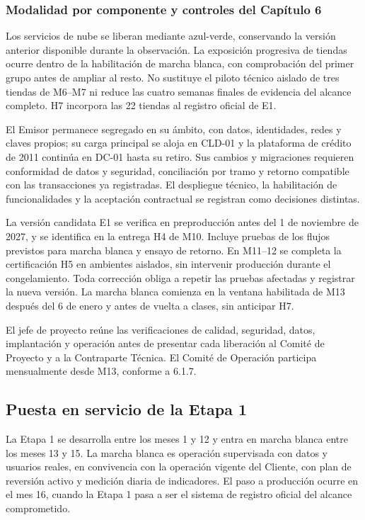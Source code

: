 \documentclass[11pt]{article}
\begin{document}
\subsubsection*{Modalidad por componente y controles del Capítulo 6}

Los servicios de nube se liberan mediante azul-verde, conservando la versión anterior disponible durante la observación. La exposición progresiva de tiendas ocurre dentro de la habilitación de marcha blanca, con comprobación del primer grupo antes de ampliar al resto. No sustituye el piloto técnico aislado de tres tiendas de M6--M7 ni reduce las cuatro semanas finales de evidencia del alcance completo. H7 incorpora las 22 tiendas al registro oficial de E1.

El Emisor permanece segregado en su ámbito, con datos, identidades, redes y claves propios; su carga principal se aloja en CLD-01 y la plataforma de crédito de 2011 continúa en DC-01 hasta su retiro. Sus cambios y migraciones requieren conformidad de datos y seguridad, conciliación por tramo y retorno compatible con las transacciones ya registradas. El despliegue técnico, la habilitación de funcionalidades y la aceptación contractual se registran como decisiones distintas.

La versión candidata E1 se verifica en preproducción antes del 1 de noviembre de 2027, y se identifica en la entrega H4 de M10. Incluye pruebas de los flujos previstos para marcha blanca y ensayo de retorno. En M11–12 se completa la certificación H5 en ambientes aislados, sin intervenir producción durante el congelamiento. Toda corrección obliga a repetir las pruebas afectadas y registrar la nueva versión. La marcha blanca comienza en la ventana habilitada de M13 después del 6 de enero y antes de vuelta a clases, sin anticipar H7.

El jefe de proyecto reúne las verificaciones de calidad, seguridad, datos, implantación y operación antes de presentar cada liberación al Comité de Proyecto y a la Contraparte Técnica. El Comité de Operación participa mensualmente desde M13, conforme a 6.1.7.

\subsection*{Puesta en servicio de la Etapa 1}

La Etapa 1 se desarrolla entre los meses 1 y 12 y entra en marcha blanca entre los meses 13 y 15. La marcha blanca es operación supervisada con datos y usuarios reales, en convivencia con la operación vigente del Cliente, con plan de reversión activo y medición diaria de indicadores. El paso a producción ocurre en el mes 16, cuando la Etapa 1 pasa a ser el sistema de registro oficial del alcance comprometido.
\end{document}

